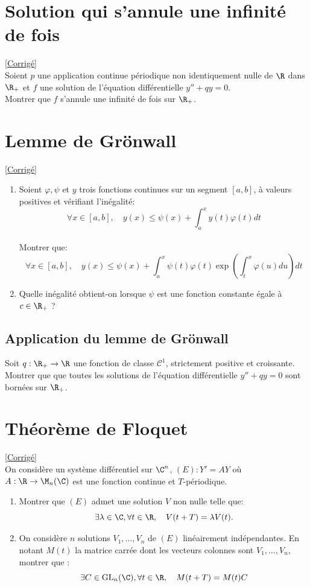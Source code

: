 \documentclass{book}
\begin{document}
\section{Solution qui s'annule une infinité de fois}
\label{Solution qui s'annule une infinité de fois}
\textcolor{blue}{\hyperref[sec:solution-qui-sannule-une-infinite-de-fois]{[Corrigé]}}\\
Soient $p$ une application continue périodique non identiquement nulle de $\R$ dans $\R_+$ et $f$ une solution de l'équation différentielle $y''+qy=0$. 
\\Montrer que $f$ s'annule une infinité de fois sur $\R_+$.

\section{Lemme de Grönwall}
\textcolor{blue}{\hyperref[sec:lemme-de-gronwall]{[Corrigé]}}\\
\label{Lemme de Gröwall}
\begin{enumerate}[leftmargin=*]
	\item Soient $\varphi,\psi$ et $y$ trois fonctions continues sur un segment $[a,b]$, à valeurs positives et vérifiant l'inégalité: $$\forall x\in[a,b],\quad y(x)\leq \psi(x)+\int_a^x y(t)\varphi(t)dt$$
	\\Montrer que: $$\forall x\in[a,b], \quad y(x)\leq\psi(x)+\int_a^x\psi(t)\varphi(t)\exp\left(\int_t^x\varphi(u)du\right)dt$$
	\item Quelle inégalité obtient-on lorsque $\psi$ est une fonction constante égale à $c\in\R_+$ ?
\end{enumerate}

\subsection{Application du lemme de Grönwall}
Soit $q:\R_+\to\R$ une fonction de classe $\mathcal{C}^1$, strictement positive et croissante.
\\Montrer que que toutes les solutions de l'équation différentielle $y''+qy=0$ sont bornées sur $\R_+$.

\section{Théorème de Floquet}
\textcolor{blue}{\hyperref[sec:theoreme-de-floquet]{[Corrigé]}}\\
\label{Théorème de Floquet}
On considère un système différentiel sur $\C^n$, $(E):Y'=AY$ où $A:\R\to\M_n(\C)$ est une fonction continue et $T$-périodique.
\begin{enumerate}
	\item Montrer que $(E)$ admet une solution $V$ non nulle telle que: $$\exists \lambda\in\C,\forall t\in\R, \quad V(t+T)=\lambda V(t).$$
	\item On considère $n$ solutions $V_1,\dots,V_n$ de $(E)$ linéairement indépendantes. En notant $M(t)$ la matrice carrée dont les vecteurs colonnes sont $V_1,\dots,V_n$, montrer que : $$\exists C\in \text{GL}_n(\C),\forall t\in\R,\quad M(t+T)=M(t)C$$ 
\end{enumerate}
\end{document}
